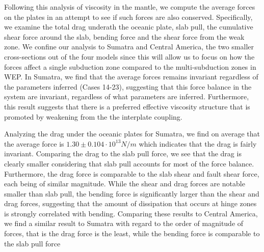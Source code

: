 \documentclass[12pt]{article}
\begin{document}
{Following this analysis of viscosity in the mantle, we compute the average forces on the plates in an attempt to see if such forces are also conserved. Specifically, we examine the total drag underath the oceanic plate, slab pull, the cumulative shear force around the slab, bending force and the shear force from the weak zone. We confine our analysis to Sumatra and Central America, the two smaller cross-sections out of the four models since this will allow us to focus on how the forces affect a single subduction zone compared to the multi-subduction zones in WEP. In Sumatra, we find that the average forces remains invariant regardless of the parameters inferred (Cases 14-23), suggesting that this force balance in the system are invariant, regardless of what parameters are inferred. Furthermore, this result suggests that there is a preferred effective viscosity structure that is promoted by weakening from the the interplate coupling.

Analyzing the drag under the oceanic plates for Sumatra, we find on average that the average force is $1.30 \pm 0.104 \cdot 10^{13}  N/m$ which indicates that the drag is fairly invariant. Comparing the drag to the slab pull force, we see that the drag is clearly smaller considering that slab pull accounts for most of the force balance. Furthermore, the drag force is comparable to the slab shear and fault shear force, each being of similar magnitude. While the shear and drag forces are notable smaller than slab pull, the bending force is significantly larger than the shear and drag forces, suggesting that the amount of dissipation that occurs at hinge zones is strongly correlated with bending. Comparing these results to Central America, we find a similar result to Sumatra with regard to the order of magnitude of forces, that is the drag force is the least, while the bending force is comparable to the slab pull force




\begin{table}

\centering


\end{table}}
\end{document}

